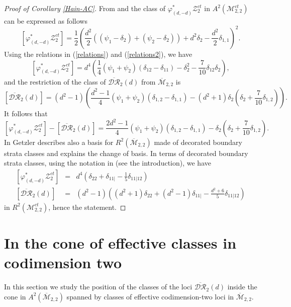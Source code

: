 \documentclass[10pt]{amsart}
\theoremstyle{definition}
\begin{document}
\begin{proof}[Proof of Corollary \ref{Hain-AC}]
From \cite{Hain} and \cite{GZ1} the class of $\varphi^*_{(d,-d)}{\mathcal{Z}}^{ct}_2$ in $A^2({\mathcal{M}}_{2,2}^{ct})$ can be expressed as follows
\[
 \left[\varphi^*_{(d,-d)}{\mathcal{Z}}^{ct}_2\right] = \frac{1}{2}\left(\frac{d^2}{2}\left( (\psi_1-\delta_2)+(\psi_2-\delta_2) \right)+d^2\delta_2-\frac{d^2}{2}\delta_{1,1} \right)^2.
\]
Using the relations in (\ref{relations}) and (\ref{relations2}), we have
\[
 \left[\varphi^*_{(d,-d)}{\mathcal{Z}}^{ct}_2\right] = d^4 \left(\frac{1}{4}\left(\psi_1+\psi_2\right)\left(\delta_{12}-\delta_{11}\right)-\delta_2^2-\frac{7}{10}\delta_{12}\delta_2 \right),
\]
and the restriction of the class of $\overline{\mathcal{DR}}_2(d)$ from ${\overline{\mathcal{M}}}_{2,2}$ is
\[
 \left[\overline{\mathcal{DR}}_2(d)\right]= (d^2-1)\left(\frac{d^2-1}{4}\left(\psi_1+\psi_2 \right)\left(\delta_{1,2}-\delta_{1,1} \right)-(d^2+1)\delta_2\left(\delta_2+\frac{7}{10}\delta_{1,2}\right) \right).
\]
It follows that
\[
 \left[\varphi^*_{(d,-d)}{\mathcal{Z}}^{ct}_2\right] - \left[\overline{\mathcal{DR}}_2(d)\right] = \frac{2d^2-1}{4}\left(\psi_1+\psi_2 \right)\left(\delta_{1,2}-\delta_{1,1} \right)-\delta_2\left(\delta_2+\frac{7}{10}\delta_{1,2}\right).
\]
In \cite{MR1672112} Getzler describes also a basis for $R^2({\overline{\mathcal{M}}}_{2,2})$ made of decorated boundary strata classes and explains the change of basis. 
In terms of decorated boundary strata classes, using the notation in \cite{MR1672112} (see the introduction), we have
\begin{eqnarray}
\label{DRct}
 \left[\varphi^*_{(d,-d)}{\mathcal{Z}}^{ct}_2\right] &=& d^4 \left(\delta_{22}+\delta_{11|}-\frac{1}{5}\delta_{11|12} \right)\nonumber\\
 \left[\overline{\mathcal{DR}}_2(d)\right] &=& (d^2-1)\left((d^2+1)\delta_{22}+(d^2-1)\delta_{11|}-\frac{d^2+6}{5}\delta_{11|12} \right)
\end{eqnarray}
in $R^2({\mathcal{M}}_{2,2}^{ct})$, hence the statement. 
\end{proof}

 

\section{In the cone of effective classes in codimension two}
\label{codim2cone}

In this section we study the position of the classes of the loci $\overline{\mathcal{DR}}_2(d)$ inside the cone in $A^2({\overline{\mathcal{M}}}_{2,2})$ spanned by classes of effective codimension-two loci in ${\overline{\mathcal{M}}}_{2,2}$.
\end{document}
